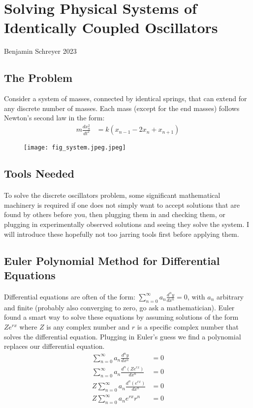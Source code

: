 \documentclass{article}
\begin{document}
	\section*{Solving Physical Systems of Identically Coupled Oscillators}
	Benjamin Schreyer 2023
	
	\subsection{The Problem}
	Consider a system of masses, connected by identical springs, that can extend for any discrete number of masses. Each mass (except for the end masses) follows
	Newton's second law in the form:
	\begin{align}
			m\frac{dx_{n}^{2}}{dt^{2}} &= k(x_{n - 1} - 2x_{n} + x_{n + 1})	
	\end{align}
		\begin{figure}[H]
		\texttt{[image: fig\_system.jpeg.jpeg]}
	\end{figure}
	
	
	\subsection{Tools Needed}
	
	\paragraph{}
	To solve the discrete oscillators problem, some significant mathematical machinery is required if one does not simply want to accept solutions that are found by others before you, then plugging them in and checking them, or plugging in experimentally observed solutions and seeing they solve the system. I will introduce these hopefully not too jarring tools first before applying them.
	\subsection{Euler Polynomial Method for Differential Equations}
	\paragraph{}
	Differential equations are often of the form: $\sum_{n=0}^{\infty}a_{n}\frac{d^{n}y}{dx^{n}} = 0$, with $a_{n}$ arbitrary and finite (probably also converging to zero, go ask a mathematician). Euler found a smart way to solve these equations by assuming solutions of the form $Ze^{rx}$ where $Z$ is any complex number and $r$ is a specific complex number that solves the differential equation. Plugging in Euler's guess we find a polynomial replaces our differential equation.
	\begin{align}
		\sum_{n=0}^{\infty}a_{n}\frac{d^{n}y}{dx^{n}} &= 0\\
		\sum_{n=0}^{\infty}a_{n}\frac{d^{n}(Ze^{rx})}{dx^{n}} &= 0\\
		Z\sum_{n=0}^{\infty}a_{n}\frac{d^{n}(e^{rx})}{dx^{n}} &= 0\\
		Z\sum_{n=0}^{\infty}a_{n}e^{rx}r^{n}&= 0
	\end{align}
\end{document}
